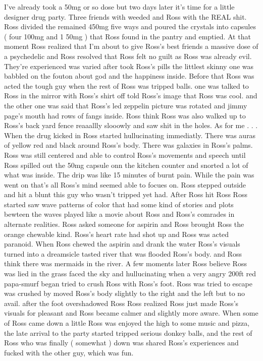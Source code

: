 \documentclass[12pt]{book}
\begin{document}
I've already took a 50mg or so dose but two days later it's time for a little designer drug party. Three friends with weeded and Ross with the REAL shit. Ross divided the remained 450mg five ways and poured the crystals into capsules ( four 100mg and 1 50mg ) that Ross found in the pantry and emptied. At that moment Ross realized that I'm about to give Ross's best friends a massive dose of a psychedelic and Ross resolved that Ross felt no guilt as Ross was already evil. They're experienced was varied after took Ross's pills the littlest skinny one was babbled on the fouton about god and the happiness inside. Before that Ross was acted the tough guy when the rest of Ross was tripped balls. one was talked to Ross in the mirror with Ross's shirt off told Ross's image that Ross was cool. and the other one was said that Ross's led zeppelin picture was rotated and jimmy page's mouth had rows of fangs inside. Ross think Ross was also walked up to Ross's back yard fence reaaallly slooowly and saw shit in the holes. As for me . . .  When the drug kicked in Ross started hullucinating immediatly. There was auras of yellow red and black around Ross's body. There was galaxies in Ross's palms. Ross was still centered and able to control Ross's movements and speech until Ross spilled out the 50mg capsule onn the kitchen counter and snorted a lot of what was inside. The drip was like 15 minutes of burnt pain. While the pain was went on that's all Ross's mind seemed able to focues on. Ross stepped outside and hit a blunt this guy who wasn't tripped yet had. After Ross hit Ross Ross started saw wave patterns of color that had some kind of stories and plots bewteen the waves played like a movie about Ross and Ross's comrades in alternate realities. Ross asked someone for aspirin and Ross brought Ross the orange chewable kind. Ross's heart rate had shot up and Ross was acted paranoid. When Ross chewed the aspirin and drank the water Ross's visuals turned into a dreamsicle tasted river that was flooded Ross's body. and Ross think there was mermaids in the river. A few moments later Ross believe Ross was lied in the grass faced the sky and hullucinating when a very angry 200ft red papa-smurf began tried to crush Ross with Ross's foot. Ross was tried to escape was crushed by moved Ross's body slightly to the right and the left but to no avail. after the foot overshadowed Ross Ross realized Ross just made Ross's visuals for pleasant and Ross became calmer and slightly more aware. When some of Ross came down a little Ross was enjoyed the high to some music and pizza, the late arrival to the party started tripped serious donkey balls, and the rest of Ross who was finally ( somewhat ) down was shared Ross's experiences and fucked with the other guy, which was fun.
\end{document}
